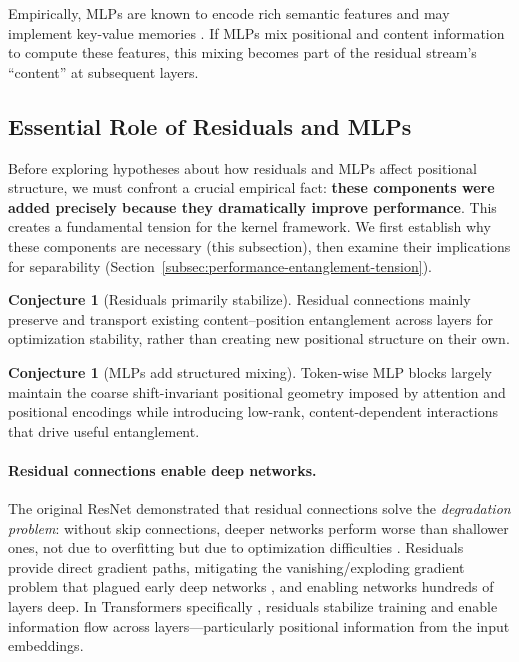\documentclass[11pt]{article}
\theoremstyle{definition}
\newtheorem{conjecture}[theorem]{Conjecture}
\begin{document}
Empirically, MLPs are known to encode rich semantic features \cite{geva2021mlp,dar2023analyzing} and may implement key-value memories \cite{geva2021mlp}. If MLPs mix positional and content information to compute these features, this mixing becomes part of the residual stream's ``content'' at subsequent layers.

\subsection{Essential Role of Residuals and MLPs}
\label{subsec:essential-performance}

Before exploring hypotheses about how residuals and MLPs affect positional structure, we must confront a crucial empirical fact: \textbf{these components were added precisely because they dramatically improve performance}. This creates a fundamental tension for the kernel framework. We first establish why these components are necessary (this subsection), then examine their implications for separability (Section~\ref{subsec:performance-entanglement-tension}).

\begin{conjecture}[Residuals primarily stabilize]
\label{conj:residual-stabilize}
Residual connections mainly preserve and transport existing content--position entanglement across layers for optimization stability, rather than creating new positional structure on their own.
\end{conjecture}

\begin{conjecture}[MLPs add structured mixing]
\label{conj:mlp-preserve}
Token-wise MLP blocks largely maintain the coarse shift-invariant positional geometry imposed by attention and positional encodings while introducing low-rank, content-dependent interactions that drive useful entanglement.
\end{conjecture}

\paragraph{Residual connections enable deep networks.}
The original ResNet \cite{he2016resnet} demonstrated that residual connections solve the \emph{degradation problem}: without skip connections, deeper networks perform worse than shallower ones, not due to overfitting but due to optimization difficulties \cite{he2016identity}. Residuals provide direct gradient paths, mitigating the vanishing/exploding gradient problem that plagued early deep networks \cite{hochreiter1991vanishing,bengio1994learning}, and enabling networks hundreds of layers deep. In Transformers specifically \cite{vaswani2017attention}, residuals stabilize training and enable information flow across layers---particularly positional information from the input embeddings.
\end{document}
